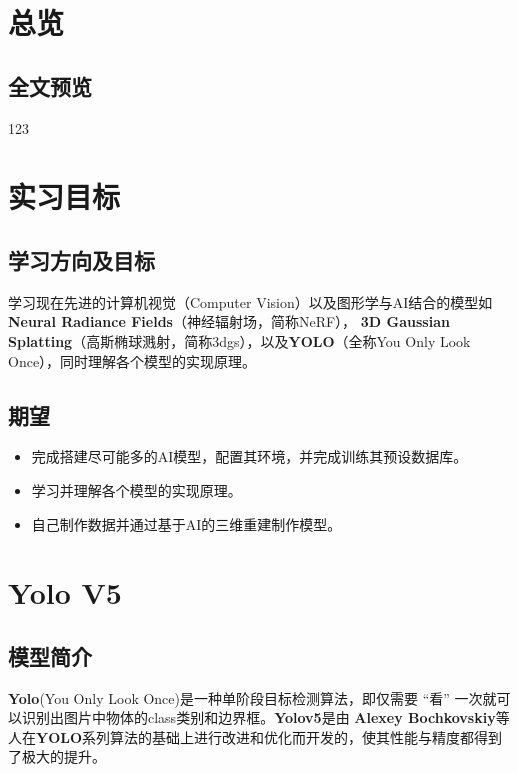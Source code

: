 \documentclass{nwputhesis}
\begin{document}
\maketitle

\newpage
\makecontent

\maketext
\fancyfoot[C]{\thepage}
\pagestyle{fancy}
\section{总览}
\subsection{全文预览}
123
\makespace
\section{实习目标}
\subsection{学习方向及目标}
学习现在先进的计算机视觉（Computer Vision）以及图形学与AI结合的模型如\textbf{Neural Radiance Fields}（神经辐射场，简称NeRF），
\textbf{3D Gaussian Splatting}（高斯椭球溅射，简称3dgs），以及\textbf{YOLO}（全称You Only Look Once），同时理解各个模型的实现原理。
\subsection{期望}
\begin{itemize}
    \item 完成搭建尽可能多的AI模型，配置其环境，并完成训练其预设数据库。
    \item 学习并理解各个模型的实现原理。
    \item 自己制作数据并通过基于AI的三维重建制作模型。
\end{itemize}
\makespace
\section{Yolo V5}
\subsection{模型简介}
\textbf{Yolo}(You Only Look Once)是一种单阶段目标检测算法，即仅需要 “看” 一次就可以识别出图片中物体的class类别和边界框。\textbf{Yolov5}是由
\textbf{Alexey Bochkovskiy}等人在\textbf{YOLO}系列算法的基础上进行改进和优化而开发的，使其性能与精度都得到了极大的提升。
\end{document}
